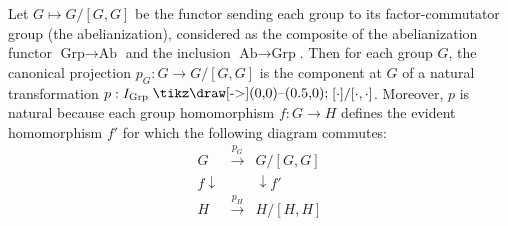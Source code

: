 Let $G \mapsto G/[G,G]$ be the functor sending each group to its factor-commutator group (the abelianization), considered as the composite of the abelianization functor $\text{Grp} \rightarrow \text{Ab}$ and the inclusion $\text{Ab} \rightarrow \text{Grp}$. Then for each group $G$, the canonical projection $p_G: G \rightarrow G/[G,G]$ is the component at $G$ of a natural transformation $p: I_{\text{Grp}} \mathbin{\raisebox{0.5pt}{\hspace{0.5pt}\tikz\draw[->](0,0)--(0.5,0);\hspace{0.5pt}}} [\cdot]/[\cdot,\cdot]$. Moreover, $p$ is natural because each group homomorphism $f: G \rightarrow H$ defines the evident homomorphism $f'$ for which the following diagram commutes:
$$
\begin{array}{ccc}
G & \xrightarrow{p_G} & G/[G,G] \\
{\scriptstyle f}\downarrow & & \downarrow {\scriptstyle f'} \\
H & \xrightarrow{p_H} & H/[H,H]
\end{array}
$$
